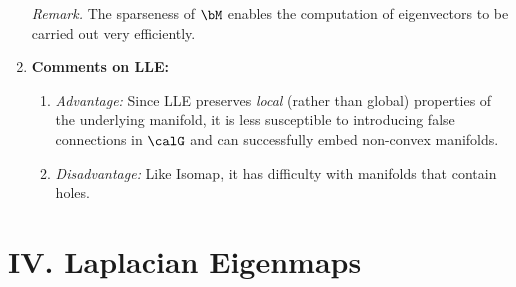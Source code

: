 \documentclass[12pt]{article}
\begin{document}
\begin{enumerate}[label=\textbf{\arabic*.}]
\begin{enumerate}
	\end{enumerate}
	
	\textit{Remark.} The sparseness of $\bM$ enables the computation of eigenvectors to be carried out very efficiently. 
	
	\item \textbf{Comments on LLE:} 
	\begin{enumerate}
		\item \textit{Advantage:} Since LLE preserves \emph{local} (rather than global) properties of the underlying manifold, it is less susceptible to introducing false connections in $\calG$ and can successfully embed non-convex manifolds. 
		\item \textit{Disadvantage:} Like Isomap, it has difficulty with manifolds that contain holes. 
	\end{enumerate}

\end{enumerate}


\section*{IV. Laplacian Eigenmaps}
\end{document}
